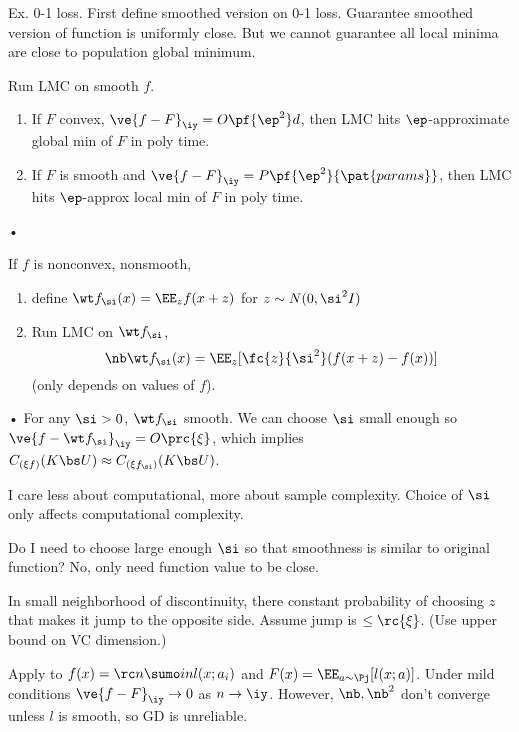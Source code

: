Ex. 0-1 loss.
First define smoothed version on 0-1 loss. Guarantee smoothed version of function is uniformly close. But we cannot guarantee all local minima are close to population global minimum.

\begin{cor}
Run LMC on smooth $f$.
\begin{enumerate}
\item
If $F$ convex, $\ve{f-F}_\iy = O\pf{\ep^2}d$, then LMC hits $\ep$-approximate global min of $F$ in poly time.
\item
If $F$ is smooth and $\ve{f-F}_\iy=P\pf{\ep^2}{\pat{params}}$, then LMC hits $\ep$-approx local min of $F$ in poly time.
\end{enumerate}•
\end{cor}
If $f$ is nonconvex, nonsmooth, 
\begin{enumerate}
\item
define $\wt f_\si(x) = \EE_z f(x+z)$ for $z\sim N(0,\si^2I)$
\item
Run LMC on $\wt f_\si$, 
$$
\nb \wt f_\si(x) = \EE_z [\fc{z}{\si^2} (f(x+z)-f(x))]
$$
(only depends on values of $f$).
\end{enumerate}•
For any $\si>0$, $\wt f_\si$ smooth. We can choose $\si$ small enough so $\ve{f-\wt f_\si}_{\iy} = O\prc{\xi}$, which implies $C_{(\xi f)}(K\bs U) \approx C_{(\xi f_\si)}(K\bs U)$. 

I care less about computational, more about sample complexity. Choice of $\si$ only affects computational complexity. 

Do I need to choose large enough $\si$ so that smoothness is similar to original  function? No, only need function value  to be close. %

In small neighborhood of discontinuity, there constant probability of choosing $z$ that makes it jump to the opposite side. %
Assume jump is $\le \rc{\xi}$. (Use upper bound on VC dimension.)


Apply to $f(x)=\rc n\sumo in l(x;a_i)$ and $F(x) = \EE_{a\sim \Pj}[l(x;a)]$.  Under mild conditions $\ve{f-F}_\iy\to 0$ as $n\to \iy$. However, $\nb, \nb^2$ don't converge unless $l$ is smooth, so GD is unreliable. 

